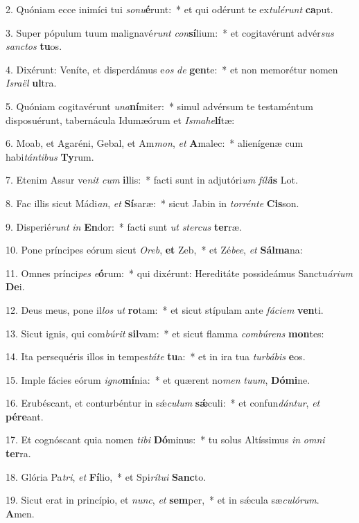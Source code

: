 2. Quóniam ecce inimíci tui \textit{so}\textit{nu}\textbf{é}runt:~*  et qui odérunt te ex\textit{tu}\textit{lé}\textit{runt} \textbf{ca}put.\

3. Super pópulum tuum malignavé\textit{runt} \textit{con}\textbf{sí}lium:~*  et cogitavérunt advér\textit{sus} \textit{sanc}\textit{tos} \textbf{tu}os.\

4. Dixérunt: Veníte, et disperdámus e\textit{os} \textit{de} \textbf{gen}te:~*  et non memorétur nomen \textit{Is}\textit{ra}\textit{ël} \textbf{ul}tra.\

5. Quóniam cogitavérunt \textit{u}\textit{na}\textbf{ní}miter:~*  simul advérsum te testaméntum disposuérunt, tabernácula Idumæórum et \textit{Is}\textit{ma}\textit{he}\textbf{lí}tæ:\

6. Moab, et Agaréni, Gebal, et Am\textit{mon}, \textit{et} \textbf{A}malec:~*  alienígenæ cum habi\textit{tán}\textit{ti}\textit{bus} \textbf{Ty}rum.\

7. Etenim Assur ve\textit{nit} \textit{cum} \textbf{il}lis:~*  facti sunt in adjutóri\textit{um} \textit{fí}\textit{li}\textbf{is} Lot.\

8. Fac illis sicut Mádi\textit{an}, \textit{et} \textbf{Sí}saræ:~*  sicut Jabin in \textit{tor}\textit{rén}\textit{te} \textbf{Cis}son.\

9. Disperié\textit{runt} \textit{in} \textbf{En}dor:~*  facti sunt \textit{ut} \textit{ster}\textit{cus} \textbf{ter}ræ.\

10. Pone príncipes eórum sicut \textit{O}\textit{reb}, \textbf{et} Zeb,~*  et Zé\textit{be}\textit{e}, \textit{et} \textbf{Sál}\textbf{ma}na:\

11. Omnes prínci\textit{pes} \textit{e}\textbf{ó}rum:~*  qui dixérunt: Hereditáte possideámus Sanctu\textit{á}\textit{ri}\textit{um} \textbf{De}i.\

12. Deus meus, pone il\textit{los} \textit{ut} \textbf{ro}tam:~*  et sicut stípulam ante \textit{fá}\textit{ci}\textit{em} \textbf{ven}ti.\

13. Sicut ignis, qui com\textit{bú}\textit{rit} \textbf{sil}vam:~*  et sicut flamma \textit{com}\textit{bú}\textit{rens} \textbf{mon}tes:\

14. Ita persequéris illos in tempes\textit{tá}\textit{te} \textbf{tu}a:~*  et in ira tua \textit{tur}\textit{bá}\textit{bis} \textbf{e}os.\

15. Imple fácies eórum \textit{i}\textit{gno}\textbf{mí}nia:~*  et quærent no\textit{men} \textit{tu}\textit{um}, \textbf{Dó}\textbf{mi}ne.\

16. Erubéscant, et conturbéntur in sǽ\textit{cu}\textit{lum} \textbf{sǽ}culi:~*  et confun\textit{dán}\textit{tur}, \textit{et} \textbf{pér}\textbf{e}ant.\

17. Et cognóscant quia nomen \textit{ti}\textit{bi} \textbf{Dó}minus:~*  tu solus Altíssimus \textit{in} \textit{om}\textit{ni} \textbf{ter}ra.\

18. Glória Pa\textit{tri}, \textit{et} \textbf{Fí}lio,~*  et Spi\textit{rí}\textit{tu}\textit{i} \textbf{Sanc}to.\

19. Sicut erat in princípio, et \textit{nunc}, \textit{et} \textbf{sem}per,~*  et in sǽcula sæ\textit{cu}\textit{ló}\textit{rum}. \textbf{A}men.\

